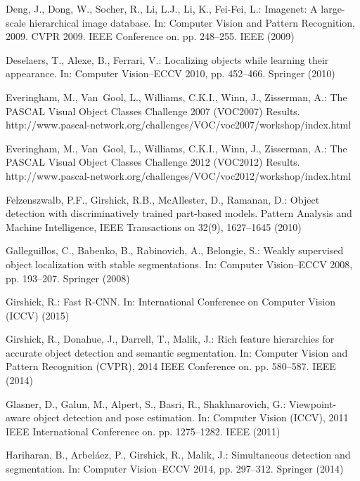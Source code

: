 \documentclass[runningheads]{llncs}
\begin{document}
\begin{thebibliography}{10}
Deng, J., Dong, W., Socher, R., Li, L.J., Li, K., Fei-Fei, L.: Imagenet: A
  large-scale hierarchical image database. In: Computer Vision and Pattern
  Recognition, 2009. CVPR 2009. IEEE Conference on. pp. 248--255. IEEE (2009)

Deselaers, T., Alexe, B., Ferrari, V.: Localizing objects while learning their
  appearance. In: Computer Vision--ECCV 2010, pp. 452--466. Springer (2010)

Everingham, M., Van~Gool, L., Williams, C.K.I., Winn, J., Zisserman, A.: The
  {PASCAL} {V}isual {O}bject {C}lasses {C}hallenge 2007 {(VOC2007)} {R}esults.
  http://www.pascal-network.org/challenges/VOC/voc2007/workshop/index.html

Everingham, M., Van~Gool, L., Williams, C.K.I., Winn, J., Zisserman, A.: The
  {PASCAL} {V}isual {O}bject {C}lasses {C}hallenge 2012 {(VOC2012)} {R}esults.
  http://www.pascal-network.org/challenges/VOC/voc2012/workshop/index.html

Felzenszwalb, P.F., Girshick, R.B., McAllester, D., Ramanan, D.: Object
  detection with discriminatively trained part-based models. Pattern Analysis
  and Machine Intelligence, IEEE Transactions on  32(9),  1627--1645 (2010)

Galleguillos, C., Babenko, B., Rabinovich, A., Belongie, S.: Weakly supervised
  object localization with stable segmentations. In: Computer Vision--ECCV
  2008, pp. 193--207. Springer (2008)

Girshick, R.: Fast {R}-{CNN}. In: International Conference on Computer Vision
  ({ICCV}) (2015)

Girshick, R., Donahue, J., Darrell, T., Malik, J.: Rich feature hierarchies for
  accurate object detection and semantic segmentation. In: Computer Vision and
  Pattern Recognition (CVPR), 2014 IEEE Conference on. pp. 580--587. IEEE
  (2014)

Glasner, D., Galun, M., Alpert, S., Basri, R., Shakhnarovich, G.:
  Viewpoint-aware object detection and pose estimation. In: Computer Vision
  (ICCV), 2011 IEEE International Conference on. pp. 1275--1282. IEEE (2011)

Hariharan, B., Arbel{\'a}ez, P., Girshick, R., Malik, J.: Simultaneous
  detection and segmentation. In: Computer Vision--ECCV 2014, pp. 297--312.
  Springer (2014)


\end{thebibliography}
\end{document}
